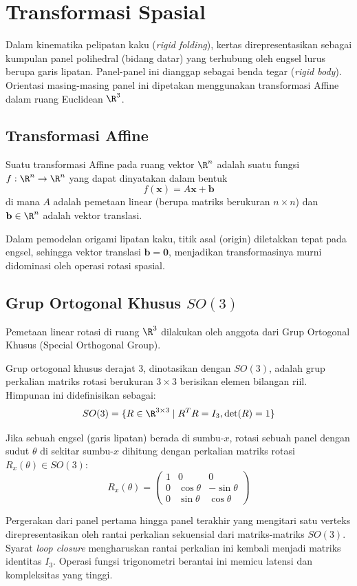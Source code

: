 \section{Transformasi Spasial}
Dalam kinematika pelipatan kaku (\textit{rigid folding}), kertas direpresentasikan sebagai kumpulan panel polihedral (bidang datar) yang terhubung oleh engsel lurus berupa garis lipatan. Panel-panel ini dianggap sebagai benda tegar (\textit{rigid body}). Orientasi masing-masing panel ini dipetakan menggunakan transformasi Affine dalam ruang Euclidean $\R^3$.

\subsection{Transformasi Affine}
\begin{definisi}
  Suatu transformasi Affine pada ruang vektor $\R^n$ adalah suatu fungsi $f: \R^n \to \R^n$ yang dapat dinyatakan dalam bentuk
  \[
    f(\mathbf{x}) = A\mathbf{x} + \mathbf{b}
  \]
  di mana $A$ adalah pemetaan linear (berupa matriks berukuran $n \times n$) dan $\mathbf{b} \in \R^n$ adalah vektor translasi.
\end{definisi}
Dalam pemodelan origami lipatan kaku, titik asal (origin) diletakkan tepat pada engsel, sehingga vektor translasi $\mathbf{b} = \mathbf{0}$, menjadikan transformasinya murni didominasi oleh operasi rotasi spasial.

\subsection{Grup Ortogonal Khusus $SO(3)$}
Pemetaan linear rotasi di ruang $\R^3$ dilakukan oleh anggota dari Grup Ortogonal Khusus (Special Orthogonal Group).
\begin{definisi}
  Grup ortogonal khusus derajat 3, dinotasikan dengan $SO(3)$, adalah grup perkalian matriks rotasi berukuran $3 \times 3$ berisikan elemen bilangan riil. Himpunan ini didefinisikan sebagai:
  \[
    SO(3) = \{ R \in \R^{3 \times 3} \mid R^T R = I_3, \det(R) = 1 \}
  \]
\end{definisi}

\begin{contoh}
  Jika sebuah engsel (garis lipatan) berada di sumbu-$x$, rotasi sebuah panel dengan sudut $\theta$ di sekitar sumbu-$x$ dihitung dengan perkalian matriks rotasi $R_x(\theta) \in SO(3)$:
  \[
    R_x(\theta) =
    \begin{pmatrix}
      1 & 0          & 0           \\
      0 & \cos\theta & -\sin\theta \\
      0 & \sin\theta & \cos\theta
    \end{pmatrix}
  \]
\end{contoh}
Pergerakan dari panel pertama hingga panel terakhir yang mengitari satu verteks direpresentasikan oleh rantai perkalian sekuensial dari matriks-matriks $SO(3)$. Syarat \textit{loop closure} mengharuskan rantai perkalian ini kembali menjadi matriks identitas $I_3$. Operasi fungsi trigonometri berantai ini memicu latensi dan kompleksitas yang tinggi.

